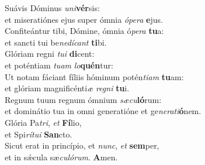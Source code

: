 \evenverse Suávis Dóminus \textit{u}\textit{ni}\textbf{vér}sis:~\*\\
\evenverse et miseratiónes ejus super ómnia \textit{ó}\textit{pe}\textit{ra} \textbf{e}jus.\\
\oddverse Confiteántur tibi, Dómine, ómnia ó\textit{pe}\textit{ra} \textbf{tu}a:~\*\\
\oddverse et sancti tui be\textit{ne}\textit{dí}\textit{cant} \textbf{ti}bi.\\
\evenverse Glóriam regni \textit{tu}\textit{i} \textbf{di}cent:~\*\\
\evenverse et poténtiam \textit{tu}\textit{am} \textit{lo}\textbf{quén}tur:\\
\oddverse Ut notam fáciant fíliis hóminum potén\textit{ti}\textit{am} \textbf{tu}am:~\*\\
\oddverse et glóriam magnificénti\textit{æ} \textit{re}\textit{gni} \textbf{tu}i.\\
\evenverse Regnum tuum regnum ómnium \textit{sæ}\textit{cu}\textbf{ló}rum:~\*\\
\evenverse et dominátio tua in omni generatióne et ge\textit{ne}\textit{ra}\textit{ti}\textbf{ó}nem.\\
\oddverse Glória Pa\textit{tri}, \textit{et} \textbf{Fí}lio,~\*\\
\oddverse et Spi\textit{rí}\textit{tu}\textit{i} \textbf{San}cto.\\
\evenverse Sicut erat in princípio, et \textit{nunc}, \textit{et} \textbf{sem}per,~\*\\
\evenverse et in sǽcula sæ\textit{cu}\textit{ló}\textit{rum}. \textbf{A}men.\\
